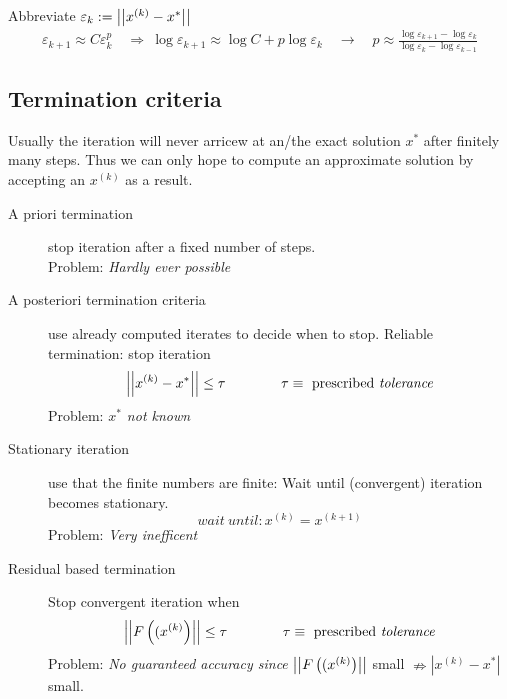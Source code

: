 	\begin{notice}
	 Abbreviate $\varepsilon_k := \left|\left| x^{(k)}- x^* \right|\right|$ 
	 \begin{align*}
	  \varepsilon_{k+1} \approx C \varepsilon_k^p \quad \Rightarrow \ \log \varepsilon_{k+1} \approx \log C + p \log \varepsilon_k \quad \rightarrow 
	  \quad p \approx \frac{\log \varepsilon_{k+1}-\log \varepsilon_k}{\log \varepsilon_k -\log \varepsilon_{k-1}}
	 \end{align*}
	\end{notice}
	
	\subsection{Termination criteria}
		Usually the iteration will never arricew at an/the exact solution $x^*$ after finitely many steps. Thus we can only hope to compute an approximate solution by accepting an $x^{(k)}$ as a result.
		
		\begin{description}
		 \item[A priori termination] stop iteration after a fixed number of steps.\\
			Problem: \emph{Hardly ever possible}
		 \item[A posteriori termination criteria] use already computed iterates to decide when to stop. Reliable termination: stop iteration 
			\[ 
				\left|\left| x^{(k)} -x^* \right|\right| \leq \tau \qquad \qquad \tau \equiv  \text{ prescribed \emph{tolerance}} 
			\]
			Problem: \emph{\(x^*\) not known}
		 \item[Stationary iteration] use that the finite numbers are finite: Wait until (convergent) iteration becomes stationary.\\
			\[
				wait\ until: x^{(k)} = x^{(k+1)} 
			\]
			Problem: \emph{Very inefficent}
		 \item[Residual based termination] Stop convergent iteration when
			\[
				\left|\left| F\left((x^{(k)}\right) \right|\right| \leq \tau \qquad \qquad \tau \equiv \text{ prescribed \emph{tolerance}} 
			\]
			Problem: \emph{No guaranteed accuracy since} \( \left|\left| F\left((x^{(k)}\right) \right|\right| \) small \( \nRightarrow |x^{(k)}-x^*| \) small.
		\end{description}
